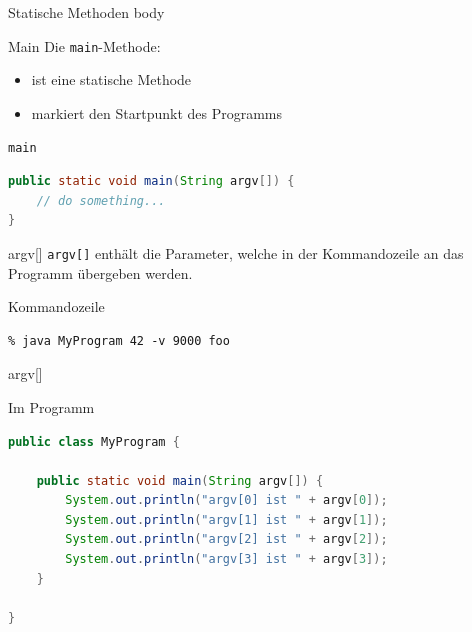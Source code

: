 \documentclass[18pt]{beamer}
\begin{document}
\begin{frame}{Statische Methoden}
    body
\end{frame}

\begin{frame}[fragile]{Main}
    Die \texttt{main}-Methode:
    \begin{itemize}
        \item ist eine statische Methode
        \item markiert den Startpunkt des Programms
    \end{itemize}

    \begin{exampleblock}{\texttt{main}}
        \begin{lstlisting}[language=Java]
public static void main(String argv[]) {
    // do something...
}
        \end{lstlisting}

    \end{exampleblock}


\end{frame}

\begin{frame}[fragile]{argv[]}
    \texttt{argv[]} enthält die Parameter, welche in der Kommandozeile an das Programm übergeben werden.
    \pause
    \begin{exampleblock}{Kommandozeile}
        \begin{lstlisting}
% java MyProgram 42 -v 9000 foo
        \end{lstlisting}
    \end{exampleblock}

\end{frame}

\begin{frame}[fragile]{argv[]}

    \begin{exampleblock}{Im Programm}
        \begin{lstlisting}[language=Java]
public class MyProgram {

    public static void main(String argv[]) {
        System.out.println("argv[0] ist " + argv[0]);
        System.out.println("argv[1] ist " + argv[1]);
        System.out.println("argv[2] ist " + argv[2]);
        System.out.println("argv[3] ist " + argv[3]);
    }

}
        \end{lstlisting}
    \end{exampleblock}

\end{frame}
\end{document}
